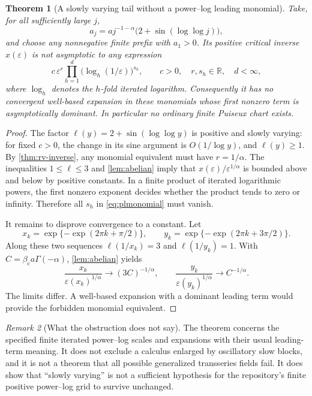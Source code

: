 \documentclass[11pt,a4paper]{article}
\numberwithin{equation}{section}
\newtheorem{theorem}{Theorem}[section]
\theoremstyle{definition}\newtheorem{definition}[theorem]{Definition}
\theoremstyle{remark}\newtheorem{remark}[theorem]{Remark}
\theoremstyle{definition}
\newcommand{\R}{\mathbb R}\newcommand{\C}{\mathbb C}
\newcommand{\bc}{\beta_{\mathrm c}}\newcommand{\rhoc}{\rho_{\mathrm c}}
\begin{document}
\begin{theorem}[A slowly varying tail without a power--log leading monomial]
\label{thm:obstruction}
Take, for all sufficiently large $j$,
\begin{equation}\label{eq:oscillating}
 a_j=a j^{-1-\alpha}\bigl(2+\sin(\log\log j)\bigr),
\end{equation}
and choose any nonnegative finite prefix with $a_1>0$. Its positive critical
inverse $x(\varepsilon)$ is not asymptotic to any expression
\begin{equation}\label{eq:plmonomial}
 c\,\varepsilon^r
 \prod_{h=1}^d\bigl(\log_h(1/\varepsilon)\bigr)^{s_h},
 \qquad c>0,\quad r,s_h\in\R,\quad d<\infty,
\end{equation}
where $\log_h$ denotes the $h$-fold iterated logarithm. Consequently it has
no convergent well-based expansion in these monomials whose first nonzero
term is asymptotically dominant. In particular no ordinary finite Puiseux
chart exists.
\end{theorem}
\begin{proof}
The factor $\ell(y)=2+\sin(\log\log y)$ is positive and slowly varying:
for fixed $c>0$, the change in its sine argument is $O(1/\log y)$, and
$\ell(y)\ge1$. By \cref{thm:rv-inverse}, any monomial equivalent must have
$r=1/\alpha$. The inequalities $1\le\ell\le3$ and
\cref{lem:abelian} imply that $x(\varepsilon)/\varepsilon^{1/\alpha}$
is bounded above and below by positive constants. In a finite product of
iterated logarithmic powers, the first nonzero exponent decides whether
the product tends to zero or infinity. Therefore all $s_h$ in
\eqref{eq:plmonomial} must vanish.

It remains to disprove convergence to a constant. Let
\[
 x_k=\exp\{-\exp(2\pi k+\pi/2)\},\qquad
 y_k=\exp\{-\exp(2\pi k+3\pi/2)\}.
\]
Along these two sequences $\ell(1/x_k)=3$ and $\ell(1/y_k)=1$. With
$C=\bc a\Gamma(-\alpha)$, \cref{lem:abelian} yields
\[
 \frac{x_k}{\varepsilon(x_k)^{1/\alpha}}\to(3C)^{-1/\alpha},\qquad
 \frac{y_k}{\varepsilon(y_k)^{1/\alpha}}\to C^{-1/\alpha}.
\]
The limits differ. A well-based expansion with a dominant leading term
would provide the forbidden monomial equivalent.
\end{proof}

\begin{remark}[What the obstruction does not say]
The theorem concerns the specified finite iterated power--log scales and
expansions with their usual leading-term meaning. It does not exclude a
calculus enlarged by oscillatory slow blocks, and it is not a theorem that
all possible generalized transseries fields fail. It does show that
``slowly varying'' is not a sufficient hypothesis for the repository's
finite positive power--log grid to survive unchanged.
\end{remark}
\end{document}
